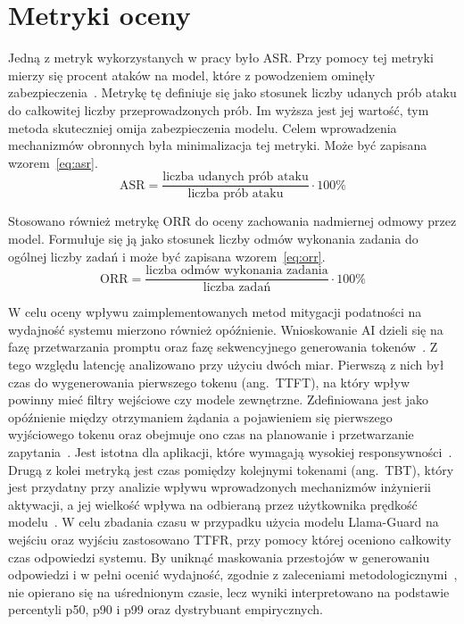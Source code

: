 \section{Metryki oceny}
Jedną z metryk wykorzystanych w pracy było \gls{ASR}. Przy pomocy tej metryki mierzy się procent ataków na model, które z powodzeniem ominęły zabezpieczenia~\cite{correia2026systematicliteraturereviewllm}.
Metrykę tę definiuje się jako stosunek liczby udanych prób ataku do całkowitej liczby przeprowadzonych prób. Im wyższa jest jej wartość, tym metoda skuteczniej omija zabezpieczenia modelu. Celem wprowadzenia mechanizmów obronnych była minimalizacja tej metryki. Może być zapisana wzorem~\eqref{eq:asr}.
\begin{equation}
    \label{eq:asr}
    \text{ASR}=\frac{\text{liczba udanych prób ataku}}{\text{liczba prób ataku}}\cdot100\%
\end{equation}

Stosowano również metrykę \gls{ORR} do oceny zachowania nadmiernej odmowy przez model. Formułuje się ją jako stosunek liczby odmów wykonania zadania do ogólnej liczby zadań i może być zapisana wzorem~\eqref{eq:orr}.
\begin{equation}
    \label{eq:orr}
    \text{ORR}=\frac{\text{liczba odmów wykonania zadania}}{\text{liczba zadań}}\cdot100\%
\end{equation}

W celu oceny wpływu zaimplementowanych metod mitygacji podatności na wydajność systemu mierzono również opóźnienie.
Wnioskowanie \gls{AI} dzieli się na fazę przetwarzania promptu oraz fazę sekwencyjnego generowania tokenów~\cite{agrawal2025evaluatingperformancellminference}.
Z tego względu latencję analizowano przy użyciu dwóch miar. Pierwszą z nich był czas do wygenerowania pierwszego tokenu (ang.~\gls{TTFT}), na który wpływ powinny mieć filtry wejściowe czy modele zewnętrzne. Zdefiniowana jest jako opóźnienie między otrzymaniem żądania a pojawieniem się pierwszego wyjściowego tokenu oraz obejmuje ono czas na planowanie i przetwarzanie zapytania~\cite{agrawal2025evaluatingperformancellminference}. Jest istotna dla aplikacji, które wymagają wysokiej responsywności~\cite{agrawal2025evaluatingperformancellminference}.
Drugą z kolei metryką jest czas pomiędzy kolejnymi tokenami (ang.~\gls{TBT}), który jest przydatny przy analizie wpływu wprowadzonych mechanizmów inżynierii aktywacji, a jej wielkość wpływa na odbieraną przez użytkownika prędkość modelu~\cite{agrawal2025evaluatingperformancellminference}. W celu zbadania czasu w przypadku użycia modelu Llama-Guard na wejściu oraz wyjściu zastosowano \gls{TTFR}, przy pomocy której oceniono całkowity czas odpowiedzi systemu.
By uniknąć maskowania przestojów w generowaniu odpowiedzi i w pełni ocenić wydajność, zgodnie z zaleceniami metodologicznymi~\cite{agrawal2025evaluatingperformancellminference}, nie opierano się na uśrednionym czasie, lecz wyniki interpretowano na podstawie percentyli p50, p90 i p99 oraz dystrybuant empirycznych.